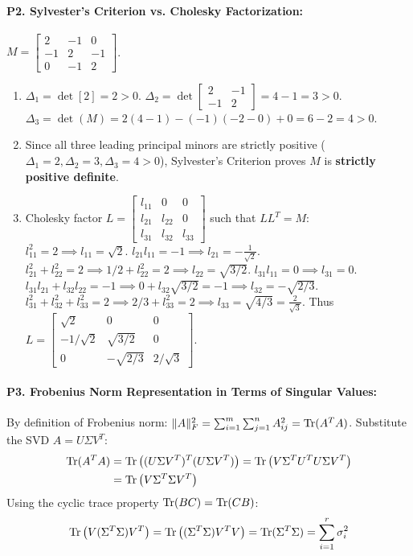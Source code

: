 \paragraph{P2. Sylvester's Criterion vs. Cholesky Factorization:}
$M = \begin{bmatrix} 2 & -1 & 0 \\ -1 & 2 & -1 \\ 0 & -1 & 2 \end{bmatrix}$.
\begin{enumerate}[label=(\alph*)]
    \item $\Delta_1 = \det[2] = 2 > 0$.
    $\Delta_2 = \det\begin{bmatrix} 2 & -1 \\ -1 & 2 \end{bmatrix} = 4 - 1 = 3 > 0$.
    $\Delta_3 = \det(M) = 2(4 - 1) - (-1)(-2 - 0) + 0 = 6 - 2 = 4 > 0$.
    \item Since all three leading principal minors are strictly positive ($\Delta_1=2, \Delta_2=3, \Delta_3=4 > 0$), Sylvester's Criterion proves $M$ is \textbf{strictly positive definite}.
    \item Cholesky factor $L = \begin{bmatrix} l_{11} & 0 & 0 \\ l_{21} & l_{22} & 0 \\ l_{31} & l_{32} & l_{33} \end{bmatrix}$ such that $L L^T = M$:
    $l_{11}^2 = 2 \implies l_{11} = \sqrt{2}$.
    $l_{21} l_{11} = -1 \implies l_{21} = -\frac{1}{\sqrt{2}}$.
    $l_{21}^2 + l_{22}^2 = 2 \implies 1/2 + l_{22}^2 = 2 \implies l_{22} = \sqrt{3/2}$.
    $l_{31} l_{11} = 0 \implies l_{31} = 0$.
    $l_{31} l_{21} + l_{32} l_{22} = -1 \implies 0 + l_{32}\sqrt{3/2} = -1 \implies l_{32} = -\sqrt{2/3}$.
    $l_{31}^2 + l_{32}^2 + l_{33}^2 = 2 \implies 2/3 + l_{33}^2 = 2 \implies l_{33} = \sqrt{4/3} = \frac{2}{\sqrt{3}}$.
    Thus $L = \begin{bmatrix} \sqrt{2} & 0 & 0 \\ -1/\sqrt{2} & \sqrt{3/2} & 0 \\ 0 & -\sqrt{2/3} & 2/\sqrt{3} \end{bmatrix}$.
\end{enumerate}

\paragraph{P3. Frobenius Norm Representation in Terms of Singular Values:}
By definition of Frobenius norm: $\|A\|_F^2 = \sum_{i=1}^m \sum_{j=1}^n A_{ij}^2 = \operatorname{Tr}(A^T A)$.
Substitute the SVD $A = U \Sigma V^T$:
\begin{align*}
\operatorname{Tr}(A^T A) &= \operatorname{Tr}\left( (U \Sigma V^T)^T (U \Sigma V^T) \right) = \operatorname{Tr}\left( V \Sigma^T U^T U \Sigma V^T \right) \\
&= \operatorname{Tr}\left( V \Sigma^T \Sigma V^T \right)
\end{align*}
Using the cyclic trace property $\operatorname{Tr}(BC) = \operatorname{Tr}(CB)$:
\begin{equation*}
\operatorname{Tr}\left( V (\Sigma^T \Sigma) V^T \right) = \operatorname{Tr}\left( (\Sigma^T \Sigma) V^T V \right) = \operatorname{Tr}(\Sigma^T \Sigma) = \sum_{i=1}^r \sigma_i^2
\end{equation*}

